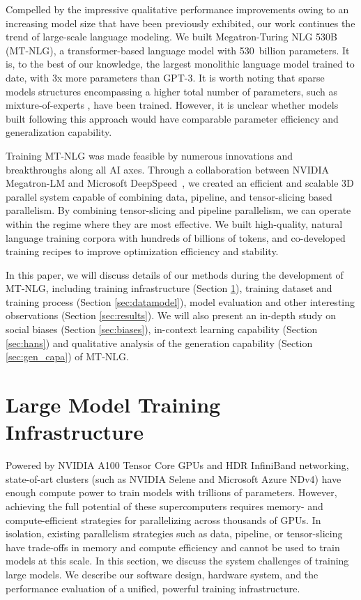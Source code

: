 \documentclass[11pt]{article}
\newcommand{\ours}{MT-NLG}
\begin{document}
Compelled by the impressive qualitative performance improvements owing to an increasing model size that have been previously exhibited, our work continues the trend of large-scale language modeling. We built Megatron-Turing NLG 530B ({\ours}), a transformer-based language model with 530~billion  parameters. It is, to the best of our knowledge, the largest monolithic language model trained to date, with 3x more parameters than GPT-3. It is worth noting that sparse models structures encompassing a higher total number of parameters, such as mixture-of-experts \cite{Shazeer2017OutrageouslyLN}, have been trained. However, it is unclear whether models built following this approach would have comparable parameter efficiency and generalization capability.

Training {\ours} was made feasible by numerous innovations and breakthroughs along all AI axes. Through a collaboration between NVIDIA Megatron-LM \cite{megatron-DBLP:journals/corr/abs-1909-08053, Megatron_2021} and Microsoft DeepSpeed~\cite{rasley2020deepspeed,deepspeedgithub}, we created an efficient and scalable 3D parallel system capable of combining data, pipeline, and tensor-slicing based parallelism. By combining tensor-slicing and pipeline parallelism, we can operate within the regime where they are most effective. We built high-quality, natural language training corpora with hundreds of billions of tokens, and co-developed training recipes to improve optimization efficiency and stability.

In this paper, we will discuss details of our methods during the development of {\ours}, including training infrastructure (Section \ref{sec:train_infra}), training dataset and training process (Section \ref{sec:datamodel}), model evaluation and other interesting observations (Section \ref{sec:results}). We will also present an in-depth study on social biases (Section \ref{sec:biases}), in-context learning capability (Section \ref{sec:hans}) and qualitative analysis of the generation capability (Section \ref{sec:gen_capa}) of {\ours}. 







\section{Large Model Training Infrastructure}
\label{sec:train_infra}

Powered by NVIDIA A100 Tensor Core GPUs and HDR InfiniBand networking, state-of-art clusters (such as NVIDIA Selene and Microsoft Azure NDv4) have enough compute power to train models with trillions of parameters. However, achieving the full potential of these supercomputers requires memory- and compute-efficient strategies for parallelizing across thousands of GPUs. 
In isolation, existing parallelism strategies such as data, pipeline, or tensor-slicing have trade-offs in memory and compute efficiency and cannot be used to train models at this scale. In this section, we discuss the system challenges of training large models.  We describe our software design, hardware system, and the performance evaluation of a unified, powerful training infrastructure.  
\end{document}

